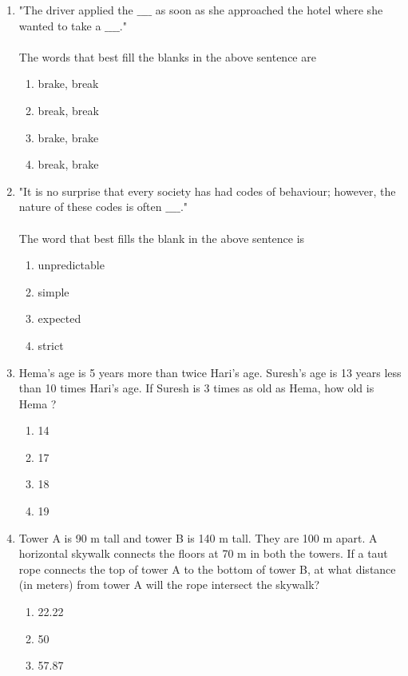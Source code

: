 \documentclass[journal]{IEEEtran}
\begin{document}
\begin{enumerate}
\item "The driver applied the $\_\_\_\_$ as soon as she approached the hotel where she wanted to take a $\_\_\_\_$." \\\\
The words that best fill the blanks in the above sentence are
\begin{enumerate}
    \item brake, break
    \item break, break
    \item brake, brake
    \item break, brake \\
\end{enumerate}
\item "It is no surprise that every society has had codes of behaviour; however, the nature of these codes is often $\_\_\_\_$." \\\\
The word that best fills the blank in the above sentence is
\begin{enumerate}
    \item unpredictable
    \item simple
    \item expected
    \item strict \\
\end{enumerate}
\item Hema's age is 5 years more than twice Hari's age. Suresh's age is 13 years less than 10 times Hari's age. If Suresh is 3 times as old as Hema, how old is Hema ?
\begin{enumerate}
    \item 14
    \item 17
    \item 18
    \item 19 \\
\end{enumerate}
\item Tower A is 90 m tall and tower B is 140 m tall. They are 100 m apart. A horizontal skywalk connects the floors at 70 m in both the towers. If a taut rope connects the top of tower A to the bottom of tower B, at what distance (in meters) from tower A will the rope intersect the skywalk?
\begin{enumerate}
    \item 22.22
    \item 50
    \item 57.87

\end{enumerate}
\end{enumerate}
\end{document}
